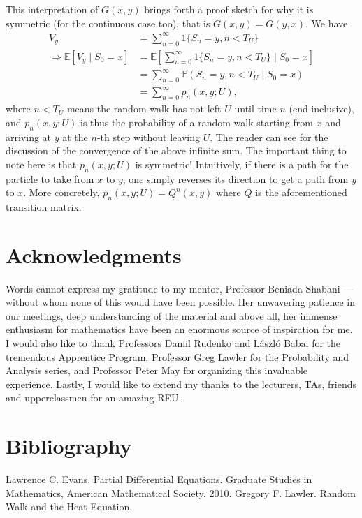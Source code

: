 \documentclass[openany, amssymb, psamsfonts]{amsart}
\theoremstyle{definition}
\numberwithin{equation}{section}
\newcommand{\bbp}{\mathbb{P}}
\newcommand{\bbe}{\mathbb{E}}
\let\implies\Rightarrow
\begin{document}
This interpretation of $G(x,y)$ brings forth a proof sketch for why it is symmetric (for the continuous case too), that is $G(x, y) = G(y, x)$. We have \begin{align*}
    V_y &= \sum_{n=0}^{\infty} 1\{S_n = y, n < T_U\} \\
    \implies \bbe [V_y \mid S_0 = x] &= \bbe \left[ \sum_{n=0}^{\infty} 1\{S_n = y, n < T_U\} \mid S_0 = x\right] \\
    &= \sum_{n=0}^{\infty} \bbp (S_n = y, n < T_U \mid S_0 = x)\\
    &= \sum_{n=0}^{\infty} p_n(x, y; U),
\end{align*}
where $n < T_U$ means the random walk has not left $U$ until time $n$ (end-inclusive), and $p_n(x, y; U)$ is thus the probability of a random walk starting from $x$ and arriving at $y$ at the $n$-th step without leaving $U$. The reader can see \cite{Lawler} for the discussion of the convergence of the above infinite sum. The important thing to note here is that $p_n(x, y; U)$ is symmetric! Intuitively, if there is a path for the particle to take from $x$ to $y$, one simply reverses its direction to get a path from $y$ to $x$. More concretely, $p_n(x, y;U) = Q^n(x, y)$ where $Q$ is the aforementioned transition matrix.

\newpage
\section*{Acknowledgments} Words cannot express my gratitude to my mentor, Professor Beniada Shabani --- without whom none of this would have been possible. Her unwavering patience in our meetings, deep understanding of the material and above all, her immense enthusiasm for mathematics have been an enormous source of inspiration for me. I would also like to thank Professors Daniil Rudenko and L\'{a}szl\'{o} Babai for the tremendous Apprentice Program, Professor Greg Lawler for the Probability and Analysis series, and Professor Peter May for organizing this invaluable experience. Lastly, I would like to extend my thanks to the lecturers, TAs, friends and upperclassmen for an amazing REU.
\section{Bibliography}
\begin{thebibliography}{9}
     Lawrence C. Evans. Partial Differential Equations. Graduate Studies in Mathematics, American Mathematical Society. 2010.
     Gregory F. Lawler. Random Walk and the Heat Equation.
\end{thebibliography}
\end{document}
